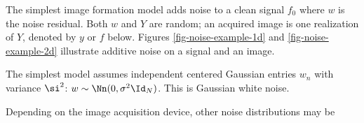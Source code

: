 The simplest image formation model adds noise to a clean signal $f_0$
where $w$ is the noise residual. Both $w$ and $Y$ are random; an acquired image is one realization of $Y$, denoted by $y$ or $f$ below. Figures \ref{fig-noise-example-1d} and \ref{fig-noise-example-2d} illustrate additive noise on a signal and an image.




The simplest model assumes independent centered Gaussian entries $w_n$ with variance $\si^2$: $w\sim\Nn(0,\sigma^2\Id_N)$. This is Gaussian white noise.

Depending on the image acquisition device, other noise distributions may be 